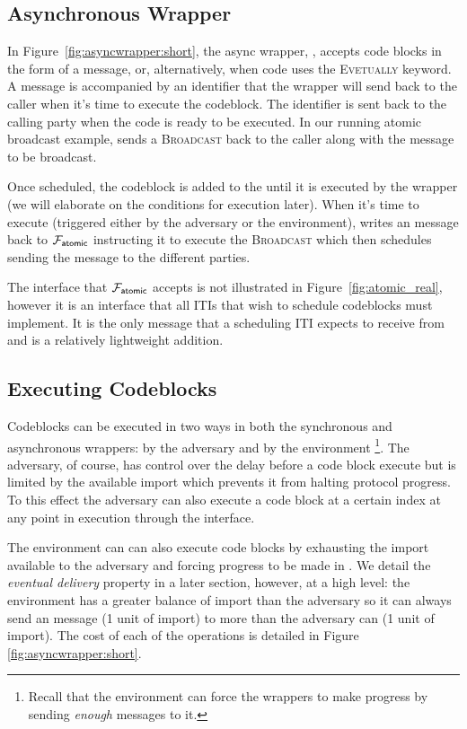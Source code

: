 
\subsection{Asynchronous Wrapper}
In Figure~\ref{fig:asyncwrapper:short}, the async wrapper, \Wasync, accepts code blocks in the form of a  message, or, alternatively, when code uses the \textsc{Evetually} keyword.
A  message is accompanied by an identifier that the wrapper will send back to the caller when it's time to execute the codeblock.
The identifier is sent back to the calling party when the code is ready to be executed. 
In our running atomic broadcast example, \Wasync sends a \textsc{Broadcast} back to the caller along with the message to be broadcast.

Once scheduled, the codeblock is added to the  until it is executed by the wrapper (we will elaborate on the conditions for execution later).
When it's time to execute (triggered either by the adversary or the environment), \Wasync writes an \Exec message back to $\mathcal{F}_{{\mathsf {atomic}}}$ instructing it to execute the \textsc{Broadcast} which then schedules sending the message to the different parties. 

The \Exec interface that $\mathcal{F}_{{\mathsf {atomic}}}$ accepts is not illustrated in Figure~\ref{fig:atomic_real}, however it is an interface that all ITIs that wish to schedule codeblocks must implement.
It is the only message that a scheduling ITI expects to receive from \Wasync and is a relatively lightweight addition. 

\subsection{Executing Codeblocks}
Codeblocks can be executed in two ways in both the synchronous and asynchronous wrappers: by the adversary and by the environment \footnote{Recall that the environment can force the wrappers to make progress by sending {\em enough} \Advance messages to it.}.
The adversary, of course, has control over the delay before a code block execute but is limited by the available import which prevents it from halting protocol progress.
To this effect the adversary can also execute a code block at a certain index at any point in execution through the \Exec interface.

The environment can can also execute code blocks by exhausting the import available to the adversary and forcing progress to be made in \Wasync.
We detail the {\em eventual delivery} property in a later section, however, at a high level: the environment has a greater balance of import than the adversary so it can always send an \Advance message (1 unit of import) to \Wasync more than the adversary can \Delay (1 unit of import).
The cost of each of the operations is detailed in Figure \ref{fig:asyncwrapper:short}.


